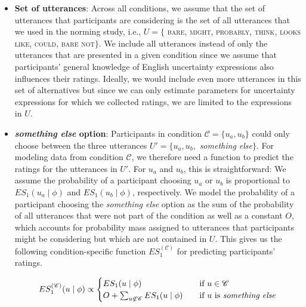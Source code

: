 \documentclass[lucida,biblatex]{sp} %
\begin{document}
\begin{itemize}
\item \textbf{Set of utterances}: Across all conditions, we assume that the set of utterances that participants are considering is the set of all utterances that we used in the norming study, i.e., $U= \{$ \textsc{bare}, \textsc{might}, \textsc{probably}, \textsc{think}, \textsc{looks like}, \textsc{could}, \textsc{bare not}$\}$. We include all utterances instead of only the utterances that are presented in a given condition since we assume that participants' general knowledge of English uncertainty expressions also influences their ratings. Ideally, we would include even more utterances in this set of alternatives but since we can only estimate parameters for uncertainty expressions for which we collected ratings, we are limited to the expressions in $U$.

\item \textbf{\textit{something else} option}: Participants in condition $\mathscr{C} = \{u_a, u_b\}$ 
could only choose between the three utterances $U' = \{u_a, u_b,$ \textit{something else}$\}$.
For modeling data from condition $\mathscr{C}$, we therefore need a function to predict the ratings 
for the utterances in $U'$. For $u_a$ and $u_b$, this is straightforward: We assume the probability 
of a participant choosing $u_a$ or $u_b$
is proportional to $ES_1(u_a \mid \phi)$ and $ES_1(u_b \mid \phi)$, respectively. 
We model the probability of a participant choosing the \textit{something else} option as the sum 
of the probability of all utterances that were not part of the condition as well as a constant $O$, 
which accounts for probability mass assigned to utterances that participants might be 
considering but which are not contained in $U$. This gives us the following condition-specific 
function $ES_1^{(\mathscr{C})}$ for predicting participants' ratings.

$$
ES_1^{(\mathscr{C})}(u \mid \phi) \propto 
     \begin{cases}
       ES_1(u \mid \phi) &\quad\text{if } u  \in \mathscr{C}\\
       O + \sum_{u \not \in \mathscr{C}} ES_1(u \mid \phi) &\quad \mbox{if $u$ is \textit{something else}} \\
     \end{cases}
$$


\end{itemize}
\end{document}
